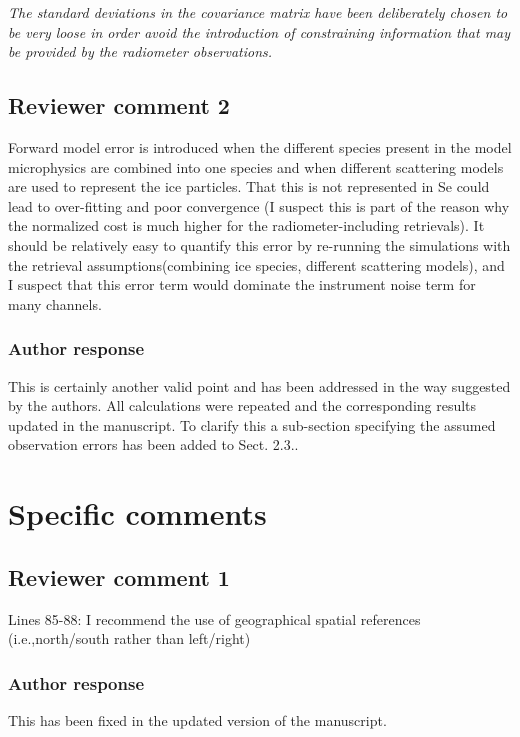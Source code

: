 \documentclass[11pt]{scrartcl}
\begin{document}
\vspace{1em}

\textit{The standard deviations in the covariance matrix have been deliberately
  chosen to be very loose in order avoid the introduction of constraining
  information that may be provided by the radiometer observations.}

\subsection*{Reviewer comment 2}

Forward model error is introduced when the different species present in the
model microphysics are combined into one species and when different scattering
models are used to represent the ice particles. That this is not represented in
Se could lead to over-fitting and poor convergence (I suspect this is part of
the reason why the normalized cost is much higher for the radiometer-including
retrievals). It should be relatively easy to quantify this error by re-running
the simulations with the retrieval assumptions(combining ice species, different
scattering models), and I suspect that this error term would dominate the
instrument noise term for many channels.

\subsubsection*{Author response}

This is certainly another valid point and has been addressed in the way suggested
by the authors. All calculations were repeated and the corresponding results
updated in the manuscript. To clarify this a sub-section specifying the assumed observation
errors has been added to Sect. 2.3..
\vspace{1em}


\section{Specific comments}

\subsection*{Reviewer comment 1}
Lines  85-88:   I  recommend  the  use  of  geographical  spatial  references  (i.e.,north/south rather than left/right)

\subsubsection*{Author response}
This has been fixed in the updated version of the manuscript.
\end{document}
